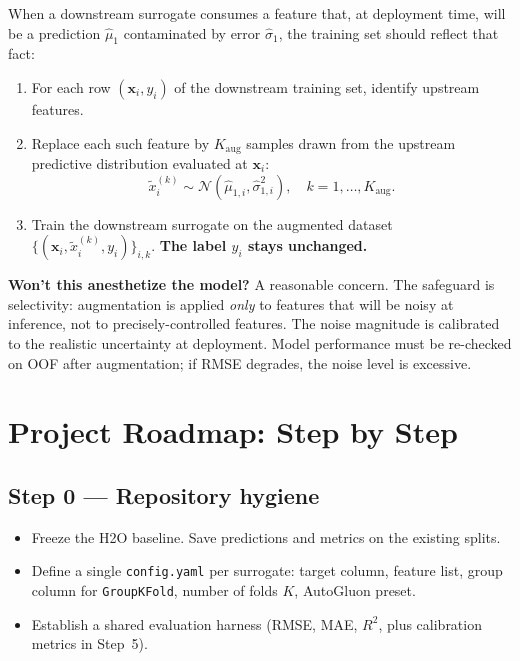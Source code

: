 \documentclass[11pt,a4paper]{article}
\begin{document}
When a downstream surrogate consumes a feature that, at deployment time, will be a prediction $\hat\mu_1$ contaminated by error $\hat\sigma_1$, the training set should reflect that fact:
\begin{enumerate}
    \item For each row $(\bm x_i, y_i)$ of the downstream training set, identify upstream features.
    \item Replace each such feature by $K_{\text{aug}}$ samples drawn from the upstream predictive distribution evaluated at $\bm x_i$:
    \[
    \tilde x_i^{(k)} \sim \mathcal{N}(\hat\mu_{1, i}, \hat\sigma^2_{1, i}), \quad k = 1, \ldots, K_{\text{aug}}.
    \]
    \item Train the downstream surrogate on the augmented dataset $\{(\bm x_i, \tilde x_i^{(k)}, y_i)\}_{i,k}$. \textbf{The label $y_i$ stays unchanged.}
\end{enumerate}

\begin{intuitionbox}
\textbf{Won't this anesthetize the model?} A reasonable concern. The safeguard is selectivity: augmentation is applied \emph{only} to features that will be noisy at inference, not to precisely-controlled features. The noise magnitude is calibrated to the realistic uncertainty at deployment. Model performance must be re-checked on OOF after augmentation; if RMSE degrades, the noise level is excessive.
\end{intuitionbox}

\section{Project Roadmap: Step by Step}
\label{sec:roadmap}

\subsection*{Step 0 --- Repository hygiene}
\begin{itemize}
    \item Freeze the H2O baseline. Save predictions and metrics on the existing splits.
    \item Define a single \texttt{config.yaml} per surrogate: target column, feature list, group column for \texttt{GroupKFold}, number of folds $K$, AutoGluon preset.
    \item Establish a shared evaluation harness (RMSE, MAE, $R^2$, plus calibration metrics in Step~5).
\end{itemize}
\end{document}
